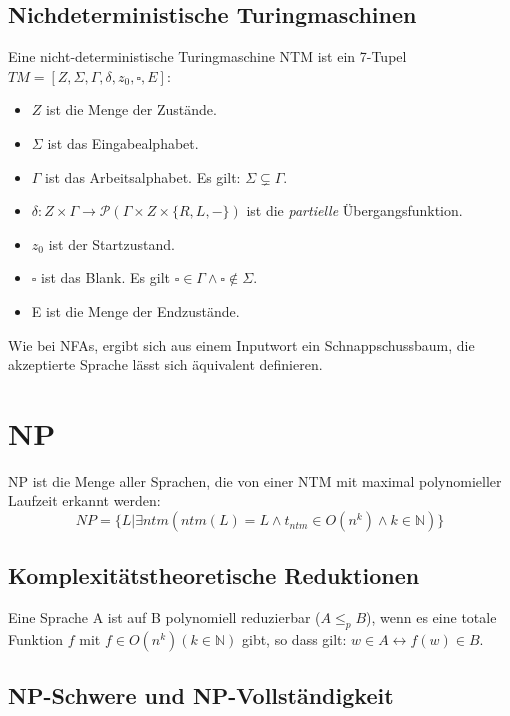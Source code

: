 \subsection{Nichdeterministische Turingmaschinen}

Eine nicht-deterministische Turingmaschine NTM ist ein 7-Tupel 
$TM = [Z, \Sigma, \Gamma, \delta, z_0, \square, E]$:
\begin{itemize}
    \item $Z$ ist die Menge der Zustände.
    \item $\Sigma$ ist das Eingabealphabet.
    \item $\Gamma$ ist das Arbeitsalphabet. Es gilt: $\Sigma \subsetneq \Gamma$.
    \item $\delta: Z \times \Gamma \rightarrow \mathcal{P}(\Gamma \times Z \times \{R,L,-\})$
        ist die \emph{partielle} Übergangsfunktion.
    \item $z_0$ ist der Startzustand.
    \item $\square$ ist das Blank.
        Es gilt $\square \in \Gamma \wedge \square \notin \Sigma$.
    \item E ist die Menge der Endzustände.
\end{itemize}

Wie bei NFAs, ergibt sich aus einem Inputwort ein Schnappschussbaum,
die akzeptierte Sprache lässt sich äquivalent definieren.

\section{NP}
NP ist die Menge aller Sprachen,
die von einer NTM mit maximal polynomieller Laufzeit erkannt werden:
\[
    NP = \{L| \exists ntm (ntm(L) = L \wedge t_{ntm} \in O(n^k) \wedge k \in \mathbb{N})\}
\]
\subsection{Komplexitätstheoretische Reduktionen}

Eine Sprache A ist auf B polynomiell reduzierbar ($A \leq_p B$), 
wenn es eine totale Funktion $f$ mit $f \in O(n^k) (k \in \mathbb{N})$ gibt,
so dass gilt: $w \in A \leftrightarrow f(w) \in B$.


\subsection{NP-Schwere und NP-Vollständigkeit}

